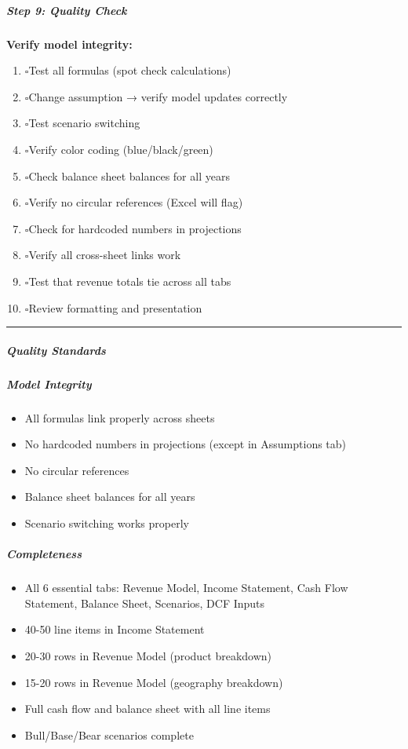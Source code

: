 \documentclass[11pt]{article}
\newcommand{\UncheckedBox}{$\square$}
\begin{document}
\subparagraph{Step 9: Quality Check}\mbox{}\par

\textbf{Verify model integrity:}

\begin{enumerate}[leftmargin=*,itemsep=2pt,topsep=2pt]
\item {} \UncheckedBox Test all formulas (spot check calculations)
\item {} \UncheckedBox Change assumption → verify model updates correctly
\item {} \UncheckedBox Test scenario switching
\item {} \UncheckedBox Verify color coding (blue/black/green)
\item {} \UncheckedBox Check balance sheet balances for all years
\item {} \UncheckedBox Verify no circular references (Excel will flag)
\item {} \UncheckedBox Check for hardcoded numbers in projections
\item {} \UncheckedBox Verify all cross-sheet links work
\item {} \UncheckedBox Test that revenue totals tie across all tabs
\item {} \UncheckedBox Review formatting and presentation
\end{enumerate}

\vspace{0.5em}\hrule\vspace{0.5em}

\subparagraph{Quality Standards}\mbox{}\par

\subparagraph{Model Integrity}\mbox{}\par
\begin{itemize}[leftmargin=*,itemsep=2pt,topsep=2pt]
\item {} All formulas link properly across sheets
\item {} No hardcoded numbers in projections (except in Assumptions tab)
\item {} No circular references
\item {} Balance sheet balances for all years
\item {} Scenario switching works properly
\end{itemize}

\subparagraph{Completeness}\mbox{}\par
\begin{itemize}[leftmargin=*,itemsep=2pt,topsep=2pt]
\item {} All 6 essential tabs: Revenue Model, Income Statement, Cash Flow Statement, Balance Sheet, Scenarios, DCF Inputs
\item {} 40-50 line items in Income Statement
\item {} 20-30 rows in Revenue Model (product breakdown)
\item {} 15-20 rows in Revenue Model (geography breakdown)
\item {} Full cash flow and balance sheet with all line items
\item {} Bull/Base/Bear scenarios complete
\end{itemize}
\end{document}
